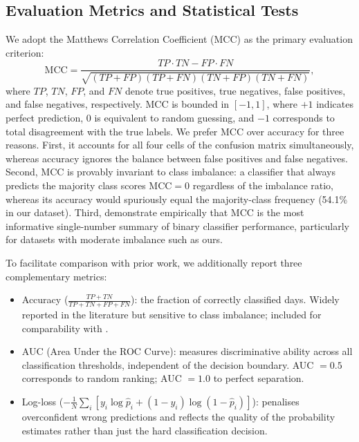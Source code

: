 \documentclass[final,3p,times,authoryear]{elsarticle}
\begin{document}
\subsection{Evaluation Metrics and Statistical Tests}

We adopt the Matthews Correlation Coefficient (MCC)
\citep{chicco2020mcc} as the primary evaluation criterion:
\begin{equation}
  \mathrm{MCC} = \frac{TP \cdot TN - FP \cdot FN}
    {\sqrt{(TP+FP)(TP+FN)(TN+FP)(TN+FN)}},
\end{equation}
where $TP$, $TN$, $FP$, and $FN$ denote true positives, true
negatives, false positives, and false negatives, respectively.
MCC is bounded in $[-1, 1]$, where $+1$ indicates perfect prediction,
$0$ is equivalent to random guessing, and $-1$ corresponds to total
disagreement with the true labels.
We prefer MCC over accuracy for three reasons.
First, it accounts for all four cells of the confusion matrix
simultaneously, whereas accuracy ignores the balance between false
positives and false negatives.
Second, MCC is provably invariant to class imbalance: a classifier
that always predicts the majority class scores $\mathrm{MCC} = 0$
regardless of the imbalance ratio, whereas its accuracy would
spuriously equal the majority-class frequency (54.1\% in our dataset).
Third, \citet{chicco2020mcc} demonstrate empirically that MCC is
the most informative single-number summary of binary classifier
performance, particularly for datasets with moderate imbalance such
as ours.

To facilitate comparison with prior work, we additionally report three
complementary metrics:
\begin{itemize}
  \item Accuracy ($\frac{TP+TN}{TP+TN+FP+FN}$): the fraction
    of correctly classified days. Widely reported in the literature but
    sensitive to class imbalance; included for comparability with
    \citet{omole2024financial, omole2025eaai}.
  \item AUC (Area Under the ROC Curve): measures
    discriminative ability across all classification thresholds,
    independent of the decision boundary. AUC $= 0.5$ corresponds to
    random ranking; AUC $= 1.0$ to perfect separation.
  \item Log-loss ($-\frac{1}{N}\sum_{i}[y_i \log \hat{p}_i +
    (1-y_i)\log(1-\hat{p}_i)]$): penalises overconfident wrong
    predictions and reflects the quality of the probability estimates
    rather than just the hard classification decision.
\end{itemize}
\end{document}
